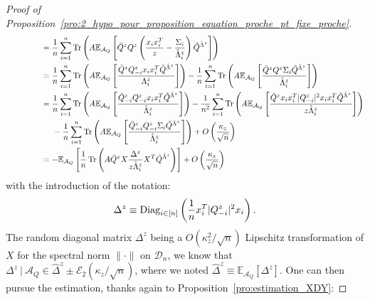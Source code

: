 \documentclass[a4papaer, titlepage]{book}
\begin{document}
\begin{proof}[Proof of Proposition~\ref{pro:2_hypo_pour_proposition_equation_proche_pt_fixe_proche}]
\begin{align*}
    &\hspace{1.5cm}= \frac{1}{n} \sum_{i=1}^n \operatorname{Tr} \left(A \mathbb E_{\mathcal A_Q} \left[\bar Q^z Q^z \left( \frac{x_ix_i^T }{z}  - \frac{\Sigma_i}{\hat \Lambda_i^z} \right) \tilde Q^{\hat\Lambda^z}\right]\right)\\
    &\hspace{1.5cm}= \frac{1}{n} \sum_{i=1}^n \operatorname{Tr} \left(A \mathbb E_{\mathcal A_Q} \left[\frac{\bar Q^z Q^z_{-i} x_ix_i^T \tilde Q^{\hat\Lambda^z} }{\Lambda_i^z}\right]\right) - \frac{1}{n} \sum_{i=1}^n \operatorname{Tr} \left(A \mathbb E_{\mathcal A_Q} \left[\frac{\bar Q^z Q^z \Sigma_i \tilde Q^{\hat\Lambda^z}}{\hat \Lambda_i^z}\right]\right)\\
    &\hspace{1.5cm}= \frac{1}{n} \sum_{i=1}^n \operatorname{Tr} \left(A \mathbb E_{\mathcal A_Q} \left[\frac{\bar Q_{-i}^z Q^z_{-i} x_ix_i^T \tilde Q^{\hat\Lambda^z} }{\hat \Lambda_i^z}\right]\right) -  \frac{1}{n^2}\sum_{i=1}^n  \operatorname{Tr} \left(A \mathbb E_{\mathcal A_Q} \left[\frac{\bar Q^z x_i x_i^T |Q^z_{-i}|^2 x_ix_i^T \tilde Q^{\hat\Lambda^z} }{z\hat \Lambda_i^z}\right]\right) \\
    &\hspace{2cm} -\frac{1}{n} \sum_{i=1}^n \operatorname{Tr} \left(A \mathbb E_{\mathcal A_Q} \left[\frac{\bar Q_{-i}^z Q_{-i}^z \Sigma_i \tilde Q^{\hat\Lambda^z}}{\hat \Lambda_i^z}\right]\right)+ O \left(\frac{\kappa_z}{\sqrt{n}}\right)\\
    &\hspace{1.5cm}= -\mathbb E_{\mathcal A_Q} \left[\frac{1}{n}  \operatorname{Tr} \left(A \bar Q^z X\frac{\Delta^z}{z\hat \Lambda_i^z} X^T \tilde Q^{\hat\Lambda^z} \right) \right]+ O \left(\frac{\kappa_z}{\sqrt{n}}\right)
    \end{align*}
    with the introduction of the notation:
    \begin{align*}
       \Delta^z \equiv \operatorname{Diag}_{i\in [n]} \left( \frac{1}{n}x_i^T |Q_{-i}^z|^2x_i \right).
     \end{align*} 
    The random diagonal matrix $\Delta^z$ being a $O(\kappa_z^2/\sqrt n)$ Lipschitz transformation of $X$ for the spectral norm $\|\cdot\|$ on $\mathcal D_n$, we know that $\Delta^z \ | \ \mathcal A_Q \in \hat \Delta^z \pm \mathcal E_2(\kappa_z/\sqrt n)$, where we noted $\hat\Delta^z \equiv \mathbb E_{\mathcal A_Q}[\Delta^z]$. One can then pursue the estimation, thanks again to Proposition~\ref{pro:estimation_XDY}:
    

\end{proof}
\end{document}
